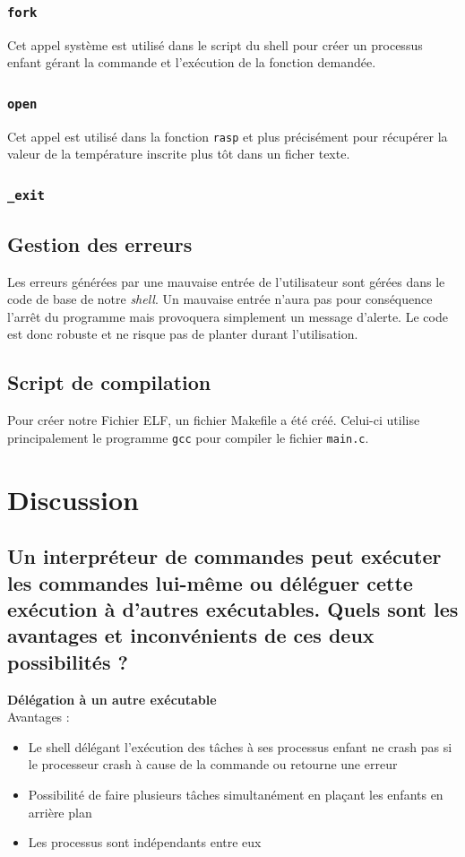 \documentclass[10pt,a4paper]{article}
\begin{document}
\subsubsection{\texttt{fork}}
Cet appel système est utilisé dans le script du shell pour créer un processus enfant gérant la commande et l'exécution de la fonction demandée. 

\subsubsection{\texttt{open}}
Cet appel est utilisé dans la fonction \texttt{rasp} et plus précisément pour récupérer la valeur de la température inscrite plus tôt dans un ficher texte. 

\subsubsection{\texttt{\_exit}}

\subsection{Gestion des erreurs}
Les erreurs générées par une mauvaise entrée de l'utilisateur sont gérées dans le code de base de notre \textit{shell}. Un mauvaise entrée n'aura pas pour conséquence l'arrêt du programme mais provoquera simplement un message d'alerte. Le code est donc robuste et ne risque pas de planter durant l'utilisation. 

\subsection{Script de compilation}
Pour créer notre Fichier ELF, un fichier Makefile a été créé. Celui-ci utilise principalement le programme \texttt{gcc} pour compiler le fichier \texttt{main.c}. 

\section{Discussion}
\subsection*{Un interpréteur de commandes peut exécuter les commandes lui-même ou déléguer cette exécution à d'autres exécutables. Quels sont les avantages et inconvénients de ces deux possibilités ?}

\textbf{Délégation à un autre exécutable\\}
Avantages :
\begin{itemize}
\item Le shell délégant l'exécution des tâches à ses processus enfant ne crash pas si le processeur crash à cause de la commande ou retourne une erreur 

\item Possibilité de faire plusieurs tâches simultanément en plaçant les enfants en arrière plan

\item Les processus sont indépendants entre eux
\end{itemize}
\end{document}
